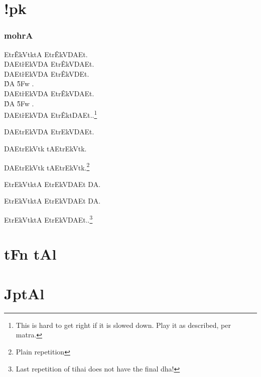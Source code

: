 \def\DevnagVersion{2.17}\documentclass{tufte-book}
\def\samaindent{\parindent=0.5in}
\def\dnitem#1{\noindent\llap{#1\space}\leftskip\parindent}
\begin{document}
\dnsamaveda

{\dn
\chapter{!pk}}

\subsection{ {\dn mohrA}}

{\dn \dnnum
{\dnsamaveda \samaindent
\dnitem{\rn{2}}

Etr\^{EkV}{}tktA Etr\^{EkV}{}DAEt.\\
DAEt\^{rEk}{}VDA Etr\^{EkV}{}DAEt.\\
DAEt\^{rEk}{}VDA Etr\^{EkV}{}DEt.\\
\hspace{0.25in} \^{DA}{} \hspace{0.5in} \^{\35Fw}{} \hspace{0.25in}.\\
DAEt\^{rEk}{}VDA Etr\^{EkV}{}DAEt.\\
\hspace{0.25in} \^{DA}{} \hspace{0.5in} \^{\35Fw}{} \hspace{0.25in}.\\
DAEt\^{rEk}{}VDA Etr\^{Ekt}{}DAEt..\footnote{This is hard to get right if it is slowed down. Play it as
described, per matra.}
\\}}



{\dn \dnnum
{\dnsamaveda \samaindent
\dnitem{\rn{3}}

DAEtrEkVDA EtrEkVDAEt.

DAEtrEkVtk tAEtrEkVtk.

DAEtrEkVtk tAEtrEkVtk.\footnote{Plain repetition}

EtrEkVtktA EtrEkVDAEt DA.

EtrEkVtktA EtrEkVDAEt DA.

EtrEkVtktA EtrEkVDAEt..\footnote{Last repetition of tihai does not have the final dha!}

}}


{\dn\chapter{ tFn tAl}}

{\dn\chapter{ JptAl}}
\end{document}
